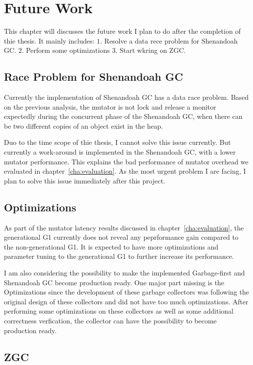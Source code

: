 \chapter{Future Work}
\label{cha:future}

This chapter will discusses the future work I plan to do after the completion
of thie thesis. It mainly includes:
$1.$ Resolve a data rece problem for Shenandoah GC.
$2.$ Perform some optimizations
$3.$ Start wkring on ZGC.

\section{Race Problem for Shenandoah GC}

Currently the implementation of Shenandoah GC has a data race problem.
Based on the previous analysis, the mutator is not lock and release a monitor
expectedly during the concurrent phase of the Shenandoah GC, when there can be
two different copies of an object exist in the heap.

Duo to the time scope of thie thesis, I cannot solve this issue currently.
But currently a work-around is implemented in the Shenandoah GC, with a lower mutator performance.
This explains the bad performance of mutator overhead we evaluated in chapter~\ref{cha:evaluation}.
As the most urgent problem I are facing, I plan to solve this issue immediately after
this project.

\section{Optimizations}

As part of the mutator latency results discussed in chapter~\ref{cha:evaluation},
the generational G1 currently does not reveal any peprformance gain compared to
the non-generational G1. It is expected to have more optimizations and parameter
tuning to the generational G1 to further increase its performance.

I am also considering the possibility to make the implemented Garbage-first
and Shenandoah GC become production ready. One major part missing is the Optimizations
since the development of these garbage collectors was following the original design
of these collectors and did not have too much optimizations. After performing some
optimizations on these collectors as well as some additional correctness verfication,
the collector can have the possibility to become production ready.

\section{ZGC}

